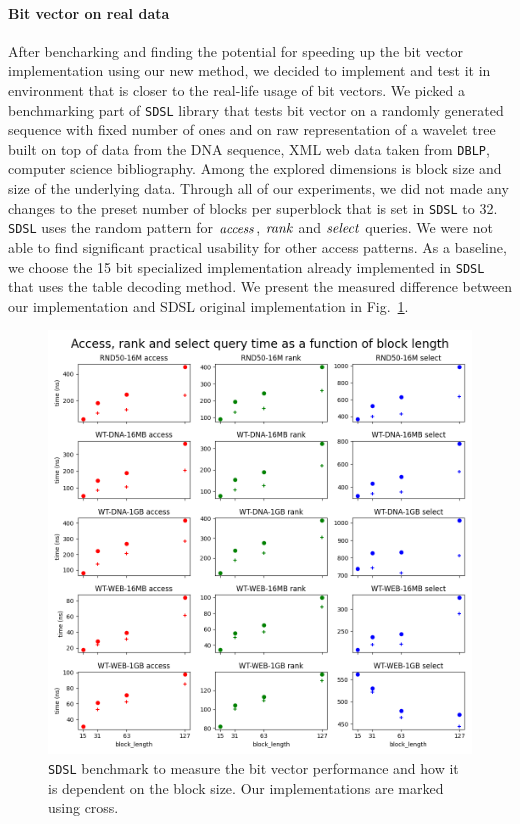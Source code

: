 \paragraph{Bit vector on real data}

After bencharking and finding the potential for speeding up the bit vector implementation using
our new method, we decided to implement and test it in environment that is closer to the real-life
usage of bit vectors. We picked a benchmarking part of \texttt{SDSL} library that tests bit vector
on a randomly generated sequence with fixed number of ones and on raw representation of a wavelet
tree built on top of data from the DNA sequence, XML web data taken from \texttt{DBLP}, computer
science bibliography. Among the explored dimensions is block size and size of the underlying data.
Through all of our experiments, we did not made any changes to the preset number of blocks per
superblock that is set in \texttt{SDSL} to 32. \texttt{SDSL} uses the random pattern for $\mathit{access}$,
$\mathit{rank}$ and $\mathit{select}$ queries. We were not able to find significant practical usability for other
access patterns. As a baseline, we choose the 15 bit specialized implementation already implemented
in \texttt{SDSL} that uses the table decoding method. We present the measured difference between our
implementation and SDSL original implementation in Fig.~\ref{obr:benchmark_sdsl_new_method}.

\begin{figure}
	\centerline{
		\includegraphics[width=\textwidth, height=0.7\textheight]{images/benchmark_sdsl_new_method}
	}
	\caption[TODO]{\texttt{SDSL} benchmark to measure the bit vector performance and how it is
	dependent on the block size. Our implementations are marked using cross. 
	}
	\label{obr:benchmark_sdsl_new_method}
\end{figure}

